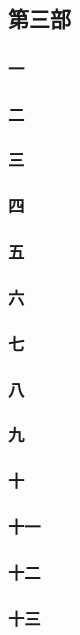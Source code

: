 \subsection*{第三部}



\subsubsection*{一}
\subsubsection*{二}
\subsubsection*{三}
\subsubsection*{四}
\subsubsection*{五}
\subsubsection*{六}
\subsubsection*{七}
\subsubsection*{八}
\subsubsection*{九}
\subsubsection*{十}
\subsubsection*{十一}
\subsubsection*{十二}
\subsubsection*{十三}
